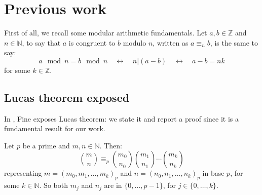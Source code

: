 

\section{Previous work}
\label{sec:previous:work}


First of all, we recall some modular arithmetic fundamentals. Let $a,b\in\mathbb{Z}$
and $n\in\mathbb{N}$, to say that $a$ is congruent to $b$ modulo $n$,
written as $a \equiv_{n} b$, is the same to say:
\begin{displaymath}
    a\mod n = b\mod n\quad \leftrightarrow\quad n \left| (a-b)\right. \quad\leftrightarrow \quad a - b = nk
\end{displaymath}
for some $k\in\mathbb{Z}$.

\subsection{Lucas theorem exposed}

In \cite{fine:1947}, Fine exposes Lucas theorem: we state it and report a proof since
it is a fundamental result for our work. 

\begin{theorem}
    Let $p$ be a prime and $m,n\in\mathbb{N}$. Then:
    \begin{displaymath}
        {{m}\choose{n}} \equiv_{p} 
            {{m_{0}}\choose{n_{0}}} 
            {{m_{1}}\choose{n_{1}}} 
            \cdots 
            {{m_{k}}\choose{n_{k}}} 
    \end{displaymath}
    representing $m=\left(m_{0},m_{1},\ldots,m_{k}\right)_{p}$ and
    $n=\left(n_{0},n_{1},\ldots,n_{k}\right)_{p}$ in base $p$, for some $k\in\mathbb{N}$.
    So both $m_{j}$ and $n_{j}$ are in $\lbrace 0,\ldots, p-1 \rbrace$, for
    $j\in\lbrace 0,\ldots,k\rbrace$.
    \label{thm:lucas:theorem}
\end{theorem}

